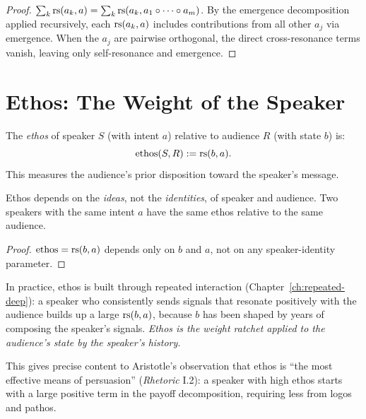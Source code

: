 \begin{proof}
$\sum_k \mathrm{rs}(a_k, a) = \sum_k \mathrm{rs}(a_k, a_1 \circ \cdots \circ a_m)$.
By the emergence decomposition applied recursively, each $\mathrm{rs}(a_k, a)$
includes contributions from all other $a_j$ via emergence.  When the $a_j$
are pairwise orthogonal, the direct cross-resonance terms vanish, leaving
only self-resonance and emergence.
\end{proof}


\section{Ethos: The Weight of the Speaker}

\begin{definition}
\label{def:ethos}
The \emph{ethos} of speaker $S$ (with intent $a$) relative to audience $R$
(with state $b$) is:
\[
  \text{ethos}(S, R) := \mathrm{rs}(b, a).
\]
This measures the audience's prior disposition toward the speaker's message.
\end{definition}

\begin{theorem}
\label{thm:ethos-independent}
Ethos depends on the \emph{ideas}, not the \emph{identities}, of speaker and
audience.  Two speakers with the same intent $a$ have the same ethos relative
to the same audience.
\end{theorem}

\begin{proof}
$\text{ethos} = \mathrm{rs}(b, a)$ depends only on $b$ and $a$, not on any
speaker-identity parameter.
\end{proof}

\begin{interpretation}
\label{interp:ethos-reputation}
In practice, ethos is built through repeated interaction (Chapter~\ref{ch:repeated-deep}): a speaker who consistently sends signals that
resonate positively with the audience builds up a large $\mathrm{rs}(b, a)$, because
$b$ has been shaped by years of composing the speaker's signals.  \emph{Ethos
is the weight ratchet applied to the audience's state by the speaker's
history.}

This gives precise content to Aristotle's observation that ethos is ``the
most effective means of persuasion'' (\emph{Rhetoric} I.2): a speaker with
high ethos starts with a large positive term in the payoff decomposition,
requiring less from logos and pathos.
\end{interpretation}

